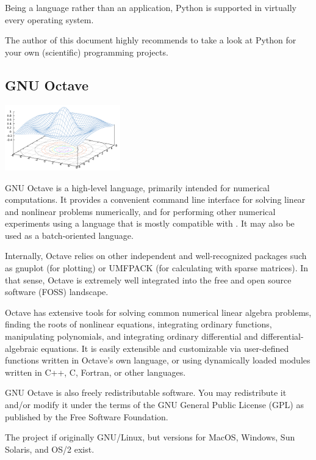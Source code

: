 Being a language rather than an application, Python is supported in virtually every operating system.

The author of this document highly recommends to take a look at Python for your own
(scientific) programming projects.



\subsection{GNU Octave}

\begin{floatingfigure}[r]{5cm}
\centering
\includegraphics[width=5cm]{figures/Octave_Sombrero}
\end{floatingfigure}

GNU Octave is a high-level language, primarily intended for numerical computations. It provides a convenient command line interface for solving linear and nonlinear problems numerically, and for performing other numerical experiments using a language that is mostly compatible with \matlab{}. It may also be used as a batch-oriented language.

Internally, Octave relies on other independent and well-recognized packages such as gnuplot (for plotting) or UMFPACK (for calculating with sparse matrices). In that sense, Octave is extremely well integrated into the free and open source software (FOSS) landscape.

Octave has extensive tools for solving common numerical linear algebra problems, finding the roots of nonlinear equations, integrating ordinary functions, manipulating polynomials, and integrating ordinary differential and differential-algebraic equations. It is easily extensible and customizable via user-defined functions written in Octave's own language, or using dynamically loaded modules written in C++, C, Fortran, or other languages.

GNU Octave is also freely redistributable software. You may redistribute it and/or modify it under the terms of the GNU General Public License (GPL) as published by the Free Software Foundation.

The project if originally GNU/Linux, but versions for MacOS, Windows, Sun Solaris, and OS/2 exist.

